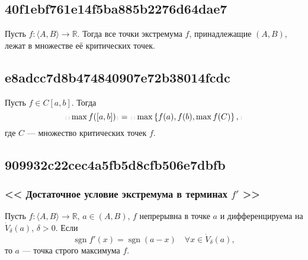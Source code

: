 \documentclass[11pt, a5paper]{article}
\newenvironment{note}[1]{\goodbreak\par\subsection{\hfill \color{lightgray}\tiny #1}}{}
\newenvironment{icloze}[2][\ldots]{%
  \ignorespaces\text{\tiny \color{lightgray}\{#2} %
}{%
  \text{\tiny\color{lightgray}\}}\unskip%
}
\begin{document}
\begin{note}{40f1ebf761e14f5ba885b2276d64dae7}
    Пусть \( f : \langle A, B \rangle \to \mathbb R  \). Тогда все
    \begin{icloze}{2}точки экстремума \( f \), принадлежащие \( (A, B) \),\end{icloze}
    лежат в \begin{icloze}{1}множестве её критических точек.\end{icloze}
\end{note}

\begin{note}{e8adcc7d8b474840907e72b38014fcdc}
    Пусть \( f \in C[a, b] \). Тогда
    \[
        \begin{icloze}{3}\max f([a, b])\end{icloze} = \begin{icloze}{1}\max \left\{ f(a), f(b), \max f(C) \right\},\end{icloze}
    \]
    где \( C \) --- \begin{icloze}{2}множество критических точек \( f \).\end{icloze}
\end{note}

\begin{note}{909932c22cec4a5fb5d8cfb506e7dbfb}
    \subsubsection{<<\begin{icloze}{4}Достаточное условие экстремума в терминах \( f' \)\end{icloze}>>}

    Пусть \begin{icloze}{3}\( f : \langle A, B \rangle \to \mathbb R \), \( a \in (A, B)  \), \( f \) непрерывна в точке \( a \) и дифференцируема на \( \dot V_{\delta} (a) \), \( \delta > 0 \).\end{icloze}
    Если
    \begin{icloze}{1}\[
        \operatorname{sgn} f'(x) = \operatorname{sgn} (a - x) \quad \forall x \in \dot V_{\delta} (a),
    \]\end{icloze}
    то \begin{icloze}{2}\( a \) --- точка строго максимума \( f \).\end{icloze}
\end{note}
\end{document}
